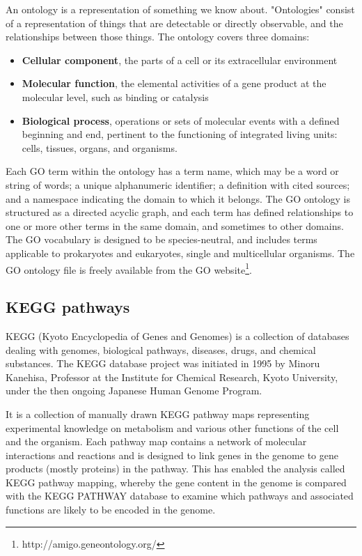 \documentclass[oneside, a4paper, 11pt]{book}
\begin{document}
An ontology is a representation of something we know about. "Ontologies" consist of a representation of things that are detectable or directly observable, and the relationships between those things. The ontology covers three domains:

\begin{itemize}
    \item \textbf{Cellular component}, the parts of a cell or its extracellular environment
    \item \textbf{Molecular function}, the elemental activities of a gene product at the molecular level, such as binding or catalysis
    \item \textbf{Biological process}, operations or sets of molecular events with a defined beginning and end, pertinent to the functioning of integrated living units: cells, tissues, organs, and organisms.
\end{itemize}

Each GO term within the ontology has a term name, which may be a word or string of words; a unique alphanumeric identifier; a definition with cited sources; and a namespace indicating the domain to which it belongs. The GO ontology is structured as a directed acyclic graph, and each term has defined relationships to one or more other terms in the same domain, and sometimes to other domains. The GO vocabulary is designed to be species-neutral, and includes terms applicable to prokaryotes and eukaryotes, single and multicellular organisms. The GO ontology file is freely available from the GO website\footnote{http://amigo.geneontology.org/}.

\subsection{KEGG pathways}
KEGG (Kyoto Encyclopedia of Genes and Genomes) is a collection of databases dealing with genomes, biological pathways, diseases, drugs, and chemical substances. The KEGG database project was initiated in 1995 by Minoru Kanehisa, Professor at the Institute for Chemical Research, Kyoto University, under the then ongoing Japanese Human Genome Program.

It is a collection of manually drawn KEGG pathway maps representing experimental knowledge on metabolism and various other functions of the cell and the organism. Each pathway map contains a network of molecular interactions and reactions and is designed to link genes in the genome to gene products (mostly proteins) in the pathway. This has enabled the analysis called KEGG pathway mapping, whereby the gene content in the genome is compared with the KEGG PATHWAY database to examine which pathways and associated functions are likely to be encoded in the genome.
\end{document}
